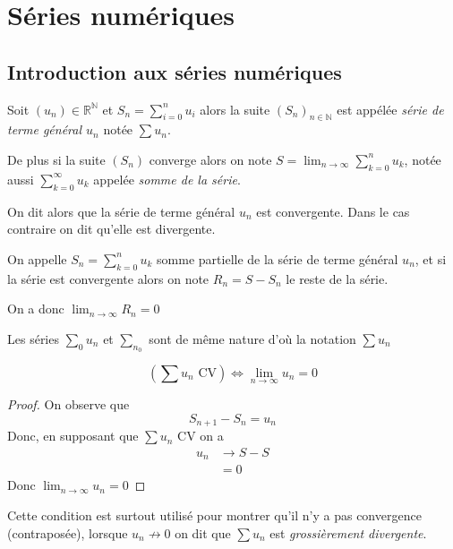 \documentclass[11pt,colorlinks]{book}
\theoremstyle{mytheoremstyle}
\theoremstyle{mytheoremstyle}
\theoremstyle{mytheoremstyle}
\theoremstyle{mytheoremstyle}
\theoremstyle{mytheoremstyle}
\theoremstyle{mytheoremstyle}
\theoremstyle{mytheoremstyle}
\theoremstyle{mytheoremstyle}
\theoremstyle{myproblemstyle}
\def\mbb#1{\mathbb{#1}}
\def\bN{\mbb{N}}
\def\bR{\mbb{R}}
\def\ln{\lim_{n \to \infty}}
\begin{document}
\chapter{Séries numériques}
\section{Introduction aux séries numériques}
\begin{definition}
  Soit $(u_n) \in \bR^{\bN}$ et $S_n = \sum_{i=0}^n u_i$ alors la suite $(S_n)_{n \in \bN}$ est appélée \textit{série de terme général $u_n$} 
  notée $\sum u_n$.
  
  De plus si la suite $(S_n)$ converge alors on note $S = \ln \sum_{k=0}^n u_k$, notée aussi $\sum_{k=0}^{\infty} u_k$ 
  appelée \textit{somme de la série}. 
  
  On dit alors que la série de terme général $u_n$ est convergente. Dans le cas contraire on dit qu'elle est divergente. 
\end{definition}
\begin{definition}
  On appelle $S_n = \sum_{k=0}^n u_k$ somme partielle de la série de terme général $u_n$, et si la série est convergente alors on note 
  $R_n = S - S_n$ le reste de la série.
\end{definition}
\begin{rmq}
  On a donc $\ln R_n = 0$
\end{rmq}
\begin{rmq}
  Les séries $\sum_{0} u_n$ et $\sum_{n_0}$ sont de même nature d'où la notation $\sum u_n$ 
\end{rmq}
\begin{prop}
  \begin{equation*}
    \left(\sum u_n \text{ CV}\right) \Leftrightarrow \ln u_n = 0
  \end{equation*}

  
  \begin{proof}
    On observe que 
    \begin{equation*}
      S_{n+1} - S_n = u_n
    \end{equation*}
    Donc, en supposant que $\sum u_n$ CV on a 
    \begin{align*}
      u_n &\to S - S \\ 
          &= 0
    \end{align*}
    Donc $\ln u_n = 0$
  \end{proof}
\end{prop}
\begin{rmq}
  Cette condition est surtout utilisé pour montrer qu'il n'y a pas convergence (contraposée), lorsque $u_n \not\to 0$ on dit 
  que $\sum u_n$ est \textit{grossièrement divergente}.
\end{rmq}
\end{document}
